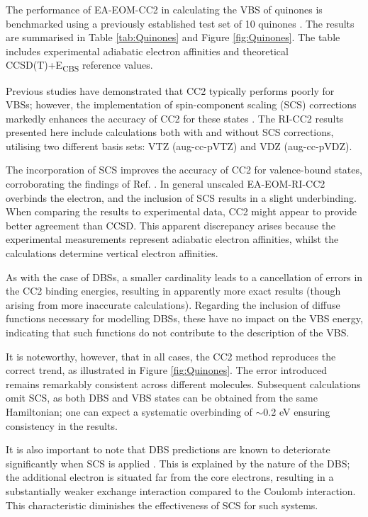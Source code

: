 The performance of EA-EOM-CC2 in calculating the VBS of quinones is benchmarked using a previously established test set of 10 quinones \cite{schulz2018systematic}. The results are summarised in Table \ref{tab:Quinones} and Figure \ref{fig:Quinones}. The table includes experimental adiabatic electron affinities and theoretical CCSD(T)+E\textsubscript{CBS} reference values.

Previous studies have demonstrated that CC2 typically performs poorly for VBSs; however, the implementation of spin-component scaling (SCS) corrections markedly enhances the accuracy of CC2 for these states \cite{paran2024performance}. The RI-CC2 results presented here include calculations both with and without SCS corrections, utilising two different basis sets: VTZ (aug-cc-pVTZ) and VDZ (aug-cc-pVDZ).

The incorporation of SCS improves the accuracy of CC2 for valence-bound states, corroborating the findings of Ref. . In general unscaled EA-EOM-RI-CC2 overbinds the electron, and the inclusion of SCS results in a slight underbinding. When comparing the results to experimental data, CC2 might appear to provide better agreement than CCSD. This apparent discrepancy arises because the experimental measurements represent adiabatic electron affinities, whilst the calculations determine vertical electron affinities. 

 As with the case of DBSs, a smaller cardinality leads to a cancellation of errors in the CC2 binding energies, resulting in apparently more exact results (though arising from more inaccurate calculations). Regarding the inclusion of diffuse functions necessary for modelling DBSs, these have no impact on the VBS energy, indicating that such functions do not contribute to the description of the VBS. 

 It is noteworthy, however, that in all cases, the CC2 method reproduces the correct trend, as illustrated in Figure \ref{fig:Quinones}. The error introduced remains remarkably consistent across different molecules. Subsequent calculations omit SCS, as both DBS and VBS states can be obtained from the same Hamiltonian; one can expect a systematic overbinding of $\mathrm{\sim}$0.2 eV ensuring consistency in the results.

It is also important to note that DBS predictions are known to deteriorate significantly when SCS is applied \cite{paran2024performance}. This is explained by the nature of the DBS; the additional electron is situated far from the core electrons, resulting in a substantially weaker exchange interaction compared to the Coulomb interaction. This characteristic diminishes the effectiveness of SCS for such systems.

